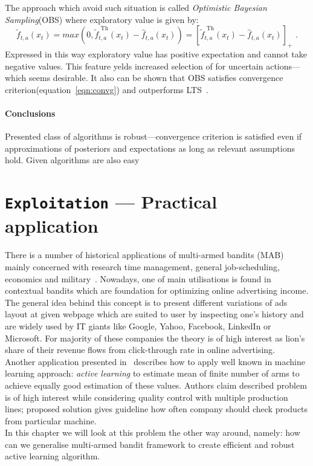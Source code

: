 \documentclass[12pt, a4paper, pdflatex, leqno]{report}
\begin{document}
The approach which avoid such situation is called \emph{Optimistic Bayesian Sampling}(OBS) where exploratory value is given by:
$$
  \tilde{f}_{t,a} (x_t) = max \left( 0, \tilde{f}_{t,a}^{\text{ Th}} (x_t) - \hat{f}_{t,a}(x_t) \right)
                        = \left [ \tilde{f}_{t,a}^{\text{ Th}} (x_t) - \hat{f}_{t,a}(x_t) \right]_+
                        \text{ .}
$$
Expressed in this way exploratory value has positive expectation and cannot take negative values. This feature yelds increased selection of for uncertain actions---which seems desirable. It also can be shown that OBS satisfies convergence criterion(equation~\ref{eqn:convg}) and outperforms LTS~\citep{May:2012:OBS:2503308.2343711}.\\

\subsubsection{Conclusions}
Presented class of algorithms is robust---convergence criterion is satisfied even if approximations of posteriors and expectations as long as relevant assumptions hold. Given algorithms are also easy \\




\chapter{\texttt{\textbf{Exploitation}} --- Practical application}

There is a number of historical applications of multi-armed bandits (MAB) mainly concerned with research time management, general job-scheduling, economics and military~\citep{gittins+glazebrook+weber}.
Nowadays, one of main utilisations is found in contextual bandits which are foundation for optimizing online advertising income. The general idea behind this concept is to present different variations of ads layout at given webpage which are suited to user by inspecting one's history and are widely used by IT giants like Google, Yahoo, Facebook, LinkedIn or Microsoft. For majority of these companies the theory is of high interest as lion's share of their revenue flows from click-through rate in online advertising.~\citep{graepel2010web, Scott:2010:MBL:1944422.1944432}\\

Another application presented in~\citep{Antos09activelearning} describes how to apply well known in machine learning approach: \emph{active learning} to estimate mean of finite number of arms to achieve equally good estimation of these values. Authors claim described problem is of high interest while considering quality control with multiple production lines; proposed solution gives guideline how often company should check products from particular machine.\\
In this chapter we will look at this problem the other way around, namely: how can we generalise multi-armed bandit framework to create efficient and robust active learning algorithm.\\
\end{document}
